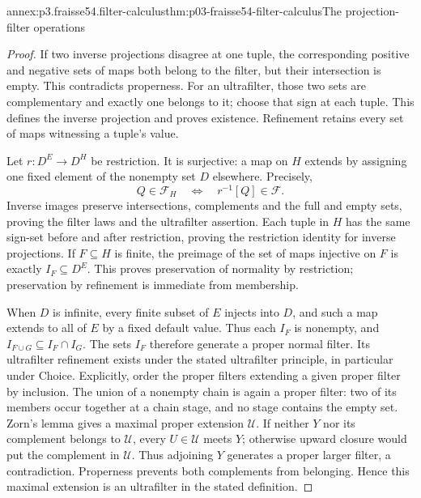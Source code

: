 \begin{annexitem}{annex:p3.fraisse54.filter-calculus}{thm:p03-fraisse54-filter-calculus}{The projection-filter operations}
\begin{proof}
If two inverse projections disagree at one tuple, the corresponding positive
and negative sets of maps both belong to the filter, but their intersection
is empty. This contradicts properness. For an ultrafilter, those two sets are
complementary and exactly one belongs to it; choose that sign at each tuple.
This defines the inverse projection and proves existence. Refinement retains
every set of maps witnessing a tuple's value.

Let \(r:D^E\to D^H\) be restriction. It is surjective: a map on \(H\)
extends by assigning one fixed element of the nonempty set \(D\) elsewhere.
Precisely,
\[
 Q\in\mathcal F_H\quad\Longleftrightarrow\quad r^{-1}[Q]\in\mathcal F.
\]
Inverse images preserve intersections, complements and the full and empty
sets, proving the filter laws and the ultrafilter assertion. Each tuple in
\(H\) has the same sign-set before and after restriction, proving the
restriction identity for inverse projections. If \(F\subseteq H\) is
finite, the preimage of the set of maps injective on \(F\) is exactly
\(I_F\subseteq D^E\). This proves preservation of normality by restriction;
preservation by refinement is immediate from membership.

When \(D\) is infinite, every finite subset of \(E\) injects into \(D\),
and such a map extends to all of \(E\) by a fixed default value. Thus each
\(I_F\) is nonempty, and
\(I_{F\cup G}\subseteq I_F\cap I_G\). The sets \(I_F\) therefore
generate a proper normal filter. Its ultrafilter refinement exists under the
stated ultrafilter principle, in particular under Choice. Explicitly, order
the proper filters extending a given proper filter by inclusion. The union
of a nonempty chain is again a proper filter: two of its members occur
together at a chain stage, and no stage contains the empty set. Zorn's
lemma gives a maximal proper extension \(\mathcal U\). If neither
\(Y\) nor its complement belongs to \(\mathcal U\), every
\(U\in\mathcal U\) meets \(Y\); otherwise upward closure would put
the complement in \(\mathcal U\). Thus adjoining \(Y\) generates a
proper larger filter, a contradiction. Properness prevents both
complements from belonging. Hence this maximal extension is an ultrafilter
in the stated definition.
\end{proof}
\end{annexitem}

